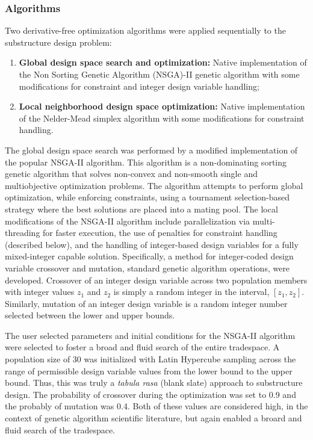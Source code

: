 \subsubsection{Algorithms}
Two derivative-free optimization algorithms were applied sequentially to
the substructure design problem:
\begin{enumerate}
\item \textbf{Global design space search and optimization:} Native
  implementation of the Non Sorting Genetic Algorithm (NSGA)-II genetic
  algorithm \citep{nsga2} with some modifications for constraint and
  integer design variable handling;
\item \textbf{Local neighborhood design space optimization:} Native
  implementation of the Nelder-Mead simplex algorithm \citep{neldermead}  with some
  modifications for constraint handling.
\end{enumerate}

The global design space search was performed by a modified
implementation of the popular NSGA-II \citep{nsga2} algorithm.  This algorithm is
a non-dominating sorting genetic algorithm that solves non-convex and
non-smooth single and multiobjective optimization problems. The
algorithm attempts to perform global optimization, while enforcing
constraints, using a tournament selection-based strategy where the best
solutions are placed into a mating pool.  The local modifications of the
NSGA-II algorithm include parallelization via multi-threading for faster
execution, the use of penalties for constraint handling (described
below), and the handling of integer-based design variables for a fully
mixed-integer capable solution.  Specifically, a method for
integer-coded design variable crossover and mutation, standard genetic
algorithm operations, were developed.  Crossover of an integer design
variable across two population members with integer values $z_1$ and
$z_2$ is simply a random integer in the interval, $[z_1, z_2]$.
Similarly, mutation of an integer design variable is a random integer
number selected between the lower and upper bounds.

The user selected parameters and initial conditions for the NSGA-II
algorithm were selected to foster a broad and fluid search of the entire
tradespace.  A population size of 30 was initialized with Latin
Hypercube sampling across the range of permissible design variable
values from the lower bound to the upper bound.  Thus, this was truly a
\textit{tabula rasa} (blank slate) approach to substructure design.  The
probability of crossover during the optimization was set to 0.9 and the
probably of mutation was 0.4.  Both of these values are considered high,
in the context of genetic algorithm scientific literature, but again
enabled a broard and fluid search of the tradespace.

